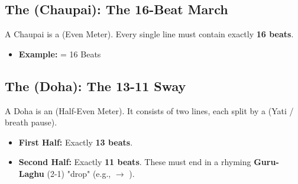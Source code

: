 \subsection*{The  (Chaupai): The 16-Beat March}
A Chaupai is a  (Even Meter). Every single line must contain exactly \textbf{16 beats}. 
\begin{itemize}
    \item \textbf{Example:}  = 16 Beats
\end{itemize}

\subsection*{The  (Doha): The 13-11 Sway}
A Doha is an  (Half-Even Meter). It consists of two lines, each split by a  (Yati / breath pause).
\begin{itemize}
    \item \textbf{First Half:} Exactly \textbf{13 beats}.
    \item \textbf{Second Half:} Exactly \textbf{11 beats}. These must end in a rhyming \textbf{Guru-Laghu} (2-1) "drop" (e.g.,  $\rightarrow$ ).
\end{itemize}

